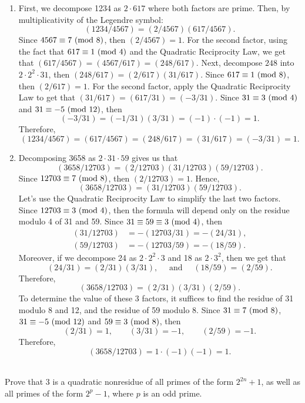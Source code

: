 \begin{solution}
\begin{enumerate}
        \item First, we decompose 1234 as $2\cdot 617$ where both factors are prime. Then, by multiplicativity of the Legendre symbol:
        $$(1234/4567) = (2/4567)(617/4567).$$
        Since $4567 \equiv 7 \ (\mathrm{mod}\ 8)$, then $(2/4567) = 1$. For the second factor, using the fact that $617 \equiv 1 \ (\mathrm{mod}\ 4)$ and the Quadratic Reciprocity Law, we get that $(617/4567) = (4567/617) = (248/617)$. Next, decompose $248$ into $2\cdot 2^2 \cdot 31$, then $(248/617) = (2/617)(31/617)$. Since $617 \equiv 1 \ (\mathrm{mod}\ 8)$, then $(2/617) = 1$. For the second factor, apply the Quadratic Reciprocity Law to get that $(31/617) = (617/31) = (-3/31)$. Since $31 \equiv 3 \ (\mathrm{mod}\ 4)$ and $31 \equiv -5 \ (\mathrm{mod}\ 12)$, then
        $$(-3/31) = (-1/31)(3/31) = (-1)\cdot (-1) = 1.$$
        Therefore,
        $$(1234/4567) = (617/4567) = (248/617) = (31/617) = (-3/31) = 1.$$
        \item Decomposing 3658 as $2 \cdot 31\cdot 59$ gives us that
        $$(3658/12703) = (2/12703)(31/12703)(59/12703).$$
        Since $12703 \equiv 7 \ (\mathrm{mod}\ 8)$, then $(2/12703) = 1$. Hence, 
        $$(3658/12703) = (31/12703)(59/12703).$$
        Let's use the Quadratic Reciprocity Law to simplify the last two factors. Since $12703 \equiv 3 \ (\mathrm{mod}\ 4)$, then the formula will depend only on the residue modulo 4 of 31 and 59. Since $31 \equiv 59 \equiv 3 \ (\mathrm{mod}\ 4)$, then
        \begin{align*}
            (31/12703) &= - (12703/31) = -(24/31), \\
            (59/12703) &= -(12703/59) = -(18/59).
        \end{align*}
        Moreover, if we decompose 24 as $2\cdot 2^2 \cdot 3$ and 18 as $2 \cdot 3^2$, then we get that
        $$(24/31) = (2/31)(3/31), \quad \text{ and }\quad (18/59) = (2/59).$$
        Therefore,
        $$(3658/12703) = (2/31)(3/31)(2/59).$$
        To determine the value of these 3 factors, it suffices to find the residue of 31 modulo 8 and 12, and the residue of 59 modulo 8. Since $31 \equiv 7 \ (\mathrm{mod}\ 8)$, $31 \equiv -5 \ (\mathrm{mod}\ 12)$ and $59 \equiv 3 \ (\mathrm{mod}\ 8)$, then
        $$(2/31) = 1, \qquad (3/31) = -1, \qquad (2/59) = -1.$$
        Therefore,
        $$(3658/12703) = 1\cdot (-1)(-1) = 1.$$\\
    \end{enumerate}
\end{solution}

\begin{exercise}
    Prove that 3 is a quadratic nonresidue of all primes of the form $2^{2n} + 1$, as well as all primes of the form $2^p - 1$, where $p$ is an odd prime.  \\
\end{exercise}

